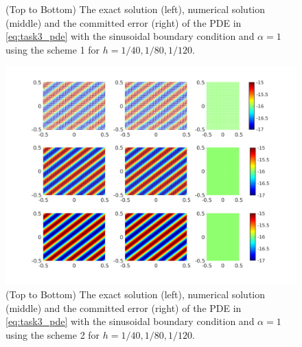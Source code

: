 \documentclass[10pt,a4paper,twoside, french]{article}
\numberwithin{equation}{section}
\numberwithin{figure}{section}
\numberwithin{table}{section}
\begin{document}
\begin{enumerate}
\begin{enumerate}[a.]
\begin{figure}[h]
\caption{(Top to Bottom) The exact solution (left), numerical solution (middle) and the committed error (right) of the PDE in \eqref{eq:task3_pde} with the sinusoidal boundary condition and $\alpha=1$ using the scheme 1 for $h = 1/40, 1/80, 1/120$.}
\label{fig:task3_scheme1_alpha1}
\end{figure}
\begin{figure}[h]
\centering
\includegraphics[scale=.8]{fig/task3_scheme2_a1_N_40_80_120}
\caption{(Top to Bottom) The exact solution (left), numerical solution (middle) and the committed error (right) of the PDE in \eqref{eq:task3_pde} with the sinusoidal boundary condition and $\alpha=1$ using the scheme 2 for $h = 1/40, 1/80, 1/120$.}
\label{fig:task3_scheme2_alpha1}
\end{figure}


\end{enumerate}
\end{enumerate}
\end{document}
